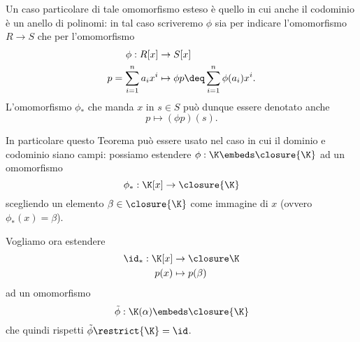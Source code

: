 Un caso particolare di tale omomorfismo esteso è quello in cui anche il codominio è un anello di polinomi: in tal caso scriveremo $\phi$ sia per indicare l'omomorfismo $R \to S$ che per l'omomorfismo \begin{align*}
    \phi : R[x] &\to S[x]\\
    p=\sum_{i=1}^n a_ix^i &\mapsto \phi p \deq \sum_{i=1}^n \phi(a_i)x^i.
\end{align*} 
L'omomorfismo $\phi_\ast$ che manda $x$ in $s \in S$ può dunque essere denotato anche \[
    p \mapsto (\phi p)(s).
\]

In particolare questo Teorema può essere usato nel caso in cui il dominio e codominio siano campi: possiamo estendere $\phi : \K \embeds \closure{\K}$ ad un omomorfismo \[
    \phi_\ast : \K[x] \to \closure{\K}
\] scegliendo un elemento $\beta \in \closure{\K}$ come immagine di $x$ (ovvero $\phi_\ast(x) = \beta$).



 Vogliamo ora estendere \begin{align*}
    \id_\ast : \K[x] &\to \closure\K \\
    p(x) &\mapsto p(\beta)
\end{align*} ad un omomorfismo \[
    \tilde\phi : \K(\alpha) \embeds \closure{\K}
\] che quindi rispetti $\tilde\phi\restrict{\K} = \id$.

